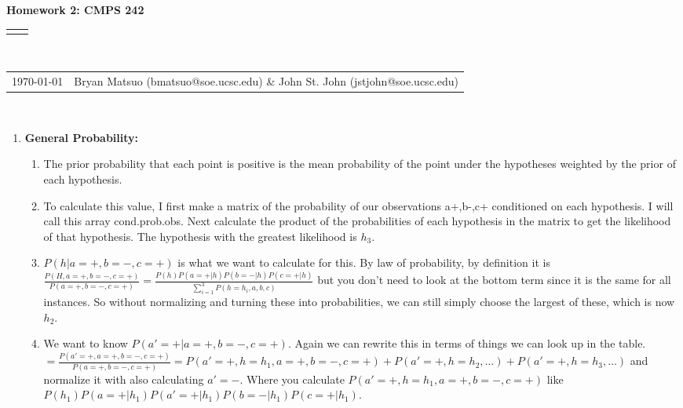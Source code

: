 \documentclass[12pt]{article}
\renewcommand{\title}[1]{\textbf{#1}\\}
\renewcommand{\line}{\begin{tabularx}{\textwidth}{X>{\raggedleft}X}\hline\\\end{tabularx}\\[-0.5cm]}
\newcommand{\leftright}[2]{\begin{tabularx}{\textwidth}{X>{\raggedleft}X}#1%
& #2\\\end{tabularx}\\[-0.5cm]}
\begin{document}
\title{Homework 2: CMPS 242}
\line
\leftright{\today}{Bryan Matsuo (bmatsuo@soe.ucsc.edu) \& John St. John (jstjohn@soe.ucsc.edu)} %
\begin{enumerate}
\item \textbf{General Probability: }

\begin{enumerate}
\item %
The prior probability that each point is positive is the mean probability of the point under the hypotheses weighted by the prior of each hypothesis.
\item %
To calculate this value, I first make a matrix of the probability of our observations a+,b-,c+ conditioned on each hypothesis. I will call this array cond.prob.obs. Next calculate the product of the probabilities of each hypothesis in the matrix to get the likelihood of that hypothesis.
The hypothesis with the greatest likelihood is $h_3$.

\item %
$P(h|a=+,b=-,c=+)$ is what we want to calculate for this. By law of probability, by definition it is $\frac{P(H, a=+, b=-, c=+)}{P(a=+,b=-,c=+)}=\frac{P(h)P(a=+|h)P(b=-|h)P(c=+|h)}{\sum_{i=1}^3 P(h=h_i,a,b,c)}$ but you don't need to look at the bottom term since it is the same for all instances.
%
So without normalizing and turning these into probabilities, we can still simply choose the largest of these, which is now $h_2$.

\item %
We want to know $P(a'=+ | a=+,b=-,c=+)$. Again we can rewrite this in terms of things we can look up in the table. $=\frac{P(a'=+, a=+, b=-, c=+)}{P(a=+,b=-,c=+)} = P(a'=+, h=h_1,a=+,b=-,c=+)+P(a'=+,h=h_2,\ldots)+P(a'=+,h=h_3,\ldots)$ and normalize it with also calculating $a'=-$. Where you calculate $P(a'=+, h=h_1,a=+,b=-,c=+)$ like $P(h_1)P(a=+|h_1)P(a'=+|h_1)P(b=-|h_1)P(c=+|h_1)$.
%


\end{enumerate}
\end{enumerate}
\end{document}
